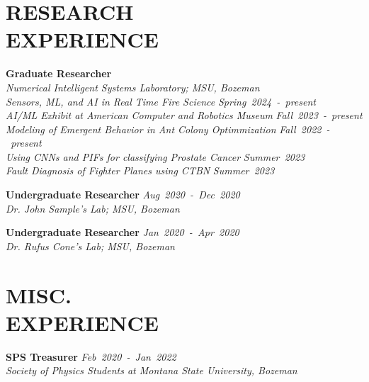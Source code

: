 \documentclass[margin]{res}
\begin{document}
\begin{resume}
\section{\uppercase{Research\\Experience}}
\noindent
\raggedright
\textbf{Graduate Researcher}\\
{\sl Numerical Intelligent Systems Laboratory; MSU, Bozeman}\\
\hspace{2ex} {\sl Sensors, ML, and AI in Real Time Fire Science} \hfill {\sl Spring~2024~-~present}\\
\hspace{2ex} {\sl AI/ML Exhibit at American Computer and Robotics Museum} \hfill {\sl Fall~2023~-~present}\\
\hspace{2ex} {\sl Modeling of Emergent Behavior in Ant Colony Optimmization} \hfill {\sl Fall~2022~-~present}\\
\hspace{2ex} {\sl Using CNNs and PIFs for classifying Prostate Cancer} \hfill {\sl Summer~2023}\\
\hspace{2ex} {\sl Fault Diagnosis of Fighter Planes using CTBN} \hfill {\sl Summer~2023} \vspace*{1ex}\\
\noindent
\raggedright
\textbf{Undergraduate Researcher}\hfill 
{\sl Aug~2020~-~Dec~2020}\\
{\sl Dr. John Sample's Lab; MSU, Bozeman}\vspace*{1ex}\\
\noindent
\raggedright
\textbf{Undergraduate Researcher}\hfill
{\sl Jan~2020~-~Apr~2020}\\
{\sl Dr. Rufus Cone's Lab; MSU, Bozeman}


\section{\uppercase{Misc.\\Experience}}
\textbf{\textbf{SPS Treasurer}}\hfill
{\sl Feb~2020~-~Jan~2022}\\
{\sl Society of Physics Students at Montana State University, Bozeman}\vspace*{1ex}\\


\end{resume}
\end{document}
